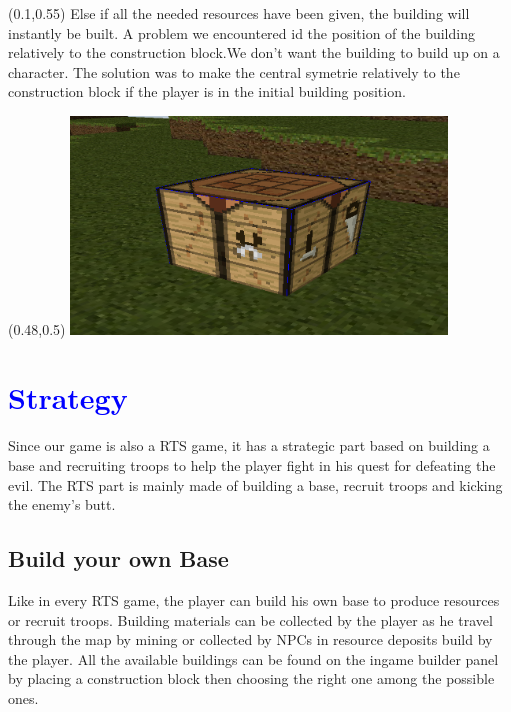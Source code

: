 \documentclass[article]{report}         %
\begin{document}
\begin{textblock}{0.33}(0.1,0.55)
	Else if all the needed resources have been given, the building will instantly be built. A problem we encountered id the position of the building relatively to the construction block.We don't want the building to build up on a character. The solution was to make the central symetrie relatively to the construction block if the player is in the initial building position. 
         \end{textblock}

\begin{textblock}{0.45}(0.48,0.5)
\includegraphics[width=10cm]{images/constructionBlock.png}
         \end{textblock}
	
    \chapter{\textcolor{blue}{Strategy}}
      
    Since our game is also a RTS game, it has a strategic part based on building a base and recruiting troops to help the player fight in his quest for defeating the evil. The RTS part is mainly made of building a base, recruit troops and kicking the enemy's butt.\\

      \section{Build your own Base}

 Like in every RTS game, the player can build his own base to produce resources or recruit troops. Building materials can be collected by the player as he travel through the map by mining or collected by NPCs in resource deposits build by the player. All the available buildings can be found on the ingame builder panel by placing a construction block then choosing the right one among the possible ones.\\
\end{document}
